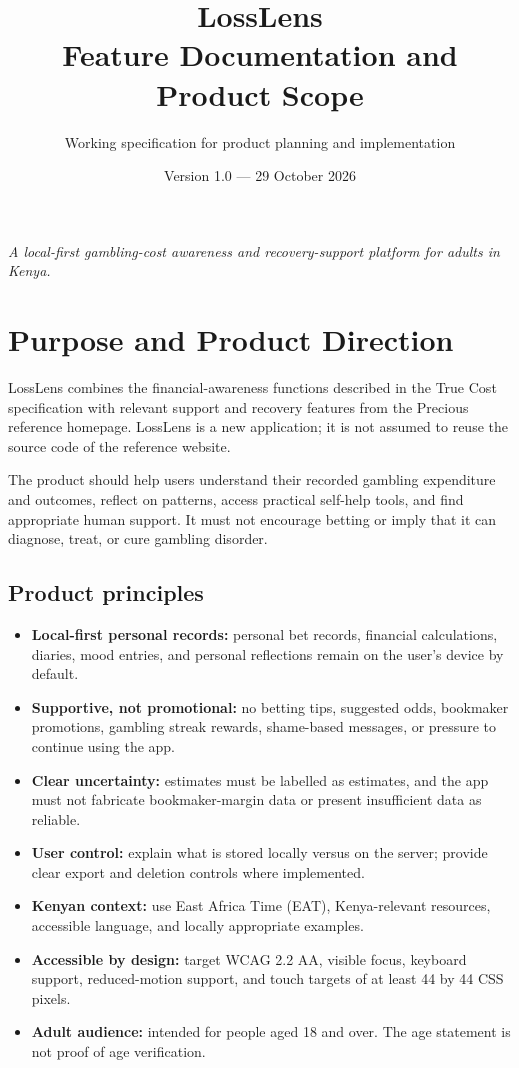 \documentclass[11pt,a4paper]{article}
\title{\textbf{LossLens}\\Feature Documentation and Product Scope}
\author{Working specification for product planning and implementation}
\date{Version 1.0 --- 29 October 2026}
\begin{document}
\maketitle

\begin{center}
\textit{A local-first gambling-cost awareness and recovery-support platform for adults in Kenya.}
\end{center}

\tableofcontents
\newpage

\section{Purpose and Product Direction}

LossLens combines the financial-awareness functions described in the True Cost specification with relevant support and recovery features from the Precious reference homepage. LossLens is a new application; it is not assumed to reuse the source code of the reference website.

The product should help users understand their recorded gambling expenditure and outcomes, reflect on patterns, access practical self-help tools, and find appropriate human support. It must not encourage betting or imply that it can diagnose, treat, or cure gambling disorder.

\subsection{Product principles}
\begin{itemize}
  \item \textbf{Local-first personal records:} personal bet records, financial calculations, diaries, mood entries, and personal reflections remain on the user's device by default.
  \item \textbf{Supportive, not promotional:} no betting tips, suggested odds, bookmaker promotions, gambling streak rewards, shame-based messages, or pressure to continue using the app.
  \item \textbf{Clear uncertainty:} estimates must be labelled as estimates, and the app must not fabricate bookmaker-margin data or present insufficient data as reliable.
  \item \textbf{User control:} explain what is stored locally versus on the server; provide clear export and deletion controls where implemented.
  \item \textbf{Kenyan context:} use East Africa Time (EAT), Kenya-relevant resources, accessible language, and locally appropriate examples.
  \item \textbf{Accessible by design:} target WCAG 2.2 AA, visible focus, keyboard support, reduced-motion support, and touch targets of at least 44 by 44 CSS pixels.
  \item \textbf{Adult audience:} intended for people aged 18 and over. The age statement is not proof of age verification.
\end{itemize}
\end{document}
